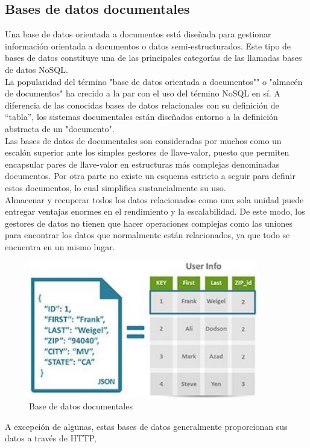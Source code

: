 \documentclass[preprint,12pt]{elsarticle}
\begin{document}
\subsection {\textbf{Bases de datos documentales}}
Una base de datos orientada a documentos está diseñada para gestionar información orientada a
documentos o datos semi-estructurados. Este tipo de bases de datos constituye una de las principales
categorías de las llamadas bases de datos NoSQL.\\
La popularidad del término "base de datos orientada a
documentos"" o "almacén de documentos" ha crecido a la par con el uso del término NoSQL en sí. A diferencia de las conocidas bases de datos relacionales con su definición de “tabla”, los sistemas documentales están diseñados entorno a la definición abstracta de un "documento".\\
Las bases de datos de documentales son consideradas por muchos como un escalón superior ante los
simples gestores de llave-valor, puesto que permiten encapsular pares de llave-valor en estructuras más
complejas denominadas documentos. Por otra parte no existe un esquema estricto a seguir para definir
estos documentos, lo cual simplifica sustancialmente su uso.\\
Almacenar y recuperar todos los datos relacionados como una sola unidad puede entregar ventajas
enormes en el rendimiento y la escalabilidad. De este modo, los gestores de datos no tienen que hacer
operaciones complejas como las uniones para encontrar los datos que normalmente están relacionados,
ya que todo se encuentra en un mismo lugar.
\begin{figure}[H]
	\begin{center}
		\includegraphics[width=10cm]{./IMAGENES/basededatos_1} 
		\caption{Base de datos documentales}
	\end{center}
\end{figure}
A excepción de algunas, estas bases de datos generalmente proporcionan sus datos a través de HTTP,
\end{document}
